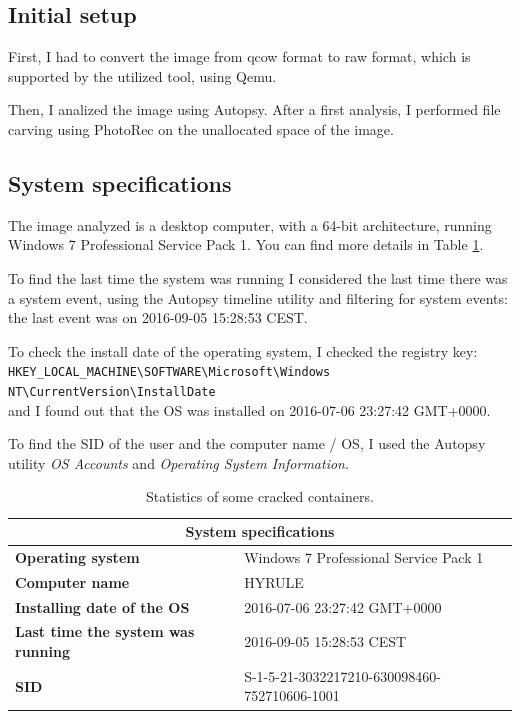 \documentclass[12pt]{article}
\begin{document}
\subsection{Initial setup}

First, I had to convert the image from qcow format to raw format, which is supported by the utilized tool, using Qemu.

Then, I analized the image using Autopsy. After a first analysis, I performed file carving using PhotoRec on the unallocated space of the image.

\subsection{System specifications}

The image analyzed is a desktop computer, with a 64-bit architecture, running Windows 7 Professional Service Pack 1. 
You can find more details in Table \ref{table:stats}.

To find the last time the system was running I considered the last time there was a system event, using the Autopsy timeline utility and filtering for system events: the last event was on 2016-09-05 15:28:53 CEST.

To check the install date of the operating system, I checked the registry key:\\ \texttt{HKEY\_LOCAL\_MACHINE\textbackslash{}SOFTWARE\textbackslash{}Microsoft\textbackslash{}Windows NT\textbackslash{}CurrentVersion\textbackslash{}InstallDate} \\
and I found out that the OS was installed on 2016-07-06 23:27:42 GMT+0000.

To find the SID of the user and the computer name / OS, I used the Autopsy utility \textit{OS Accounts} and \textit{Operating System Information}.

\begin{table}[!ht]
    \centering
    \begin{tabular}{ll}
    \toprule
        \multicolumn{2}{c}{\textbf{System specifications}} \\
        \midrule
        \textbf{Operating system} & Windows 7 Professional Service Pack 1 \\
        \textbf{Computer name} & HYRULE \\
        \textbf{Installing date of the OS} & 2016-07-06 23:27:42 GMT+0000 \\
        \textbf{Last time the system was running} & 2016-09-05 15:28:53 CEST \\
        \textbf{SID} & S-1-5-21-3032217210-630098460-752710606-1001 \\
    \bottomrule
    \end{tabular}
    \caption{Statistics of some cracked containers.}
    \label{table:stats}
\end{table}
\end{document}
